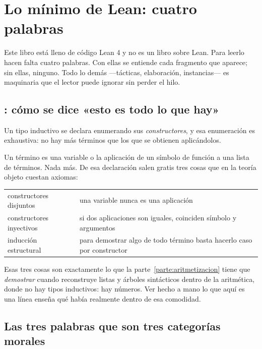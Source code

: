 \chapter{Lo mínimo de Lean: cuatro palabras}
\label{cap:lean}

Este libro está lleno de código Lean 4 y no es un libro sobre Lean. Para leerlo hacen falta cuatro
palabras. Con ellas se entiende cada fragmento que aparece; sin ellas, ninguno. Todo lo demás
—tácticas, elaboración, instancias— es maquinaria que el lector puede ignorar sin perder el hilo.

\section{: cómo se dice «esto es todo lo que hay»}

Un tipo inductivo se declara enumerando sus \emph{constructores}, y esa enumeración es exhaustiva:
no hay más términos que los que se obtienen aplicándolos.


\noindent Un término es una variable o la aplicación de un símbolo de función a una lista de
términos. Nada más. De esa declaración salen gratis tres cosas que en la teoría objeto cuestan
axiomas:

\begin{center}\small
\begin{tabularx}{\linewidth}{@{}l >{\raggedright\arraybackslash}X@{}}
\toprule
constructores disjuntos & una variable nunca es una aplicación \\
constructores inyectivos & si dos aplicaciones son iguales, coinciden símbolo y argumentos \\
inducción estructural & para demostrar algo de todo término basta hacerlo caso por constructor \\
\bottomrule
\end{tabularx}
\end{center}

\begin{leccion}
Esas tres cosas son exactamente lo que la parte~\ref{parte:aritmetizacion} tiene que \emph{demostrar} cuando reconstruye
listas y árboles sintácticos dentro de la aritmética, donde no hay tipos inductivos: hay números.
Ver hecho a mano lo que aquí es una línea enseña qué había realmente dentro de esa comodidad.
\end{leccion}

\section{Las tres palabras que son tres categorías morales}

